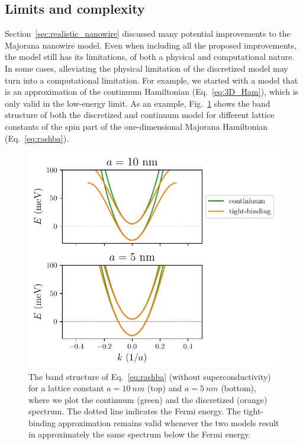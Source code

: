 \subsection{Limits and complexity}
Section~\ref{sec:realistic_nanowire} discussed many potential improvements to the Majorana nanowire model.
Even when including all the proposed improvements, the model still has its limitations, of both a physical and computational nature.
In some cases, alleviating the physical limitation of the discretized model may turn into a computational limitation.
For example, we started with a model that is an approximation of the continuum Hamiltonian (Eq.~\eqref{eq:3D_Ham}), which is only valid in the low-energy limit.
As an example, Fig.~\ref{fig:discretization-approximation} shows the band structure of both the discretized and continuum model for different lattice constants of the spin part of the one-dimensional Majorana Hamiltonian (Eq.~\eqref{eq:rashba}).
\begin{figure}[!htb]
\begin{center}
\includegraphics{chapter_introduction/figures/discretization-approximation.pdf}
\caption{
The band structure of Eq.~\eqref{eq:rashba} (without superconductivity) for a lattice constant $a=\SI{10}{nm}$ (top) and $a=\SI{5}{nm}$ (bottom), where we plot the continuum (green) and the discretized (orange) spectrum.
The dotted line indicates the Fermi energy.
The tight-binding approximation remains valid whenever the two models result in approximately the same spectrum below the Fermi energy.
\label{fig:discretization-approximation}}
\end{center}
\end{figure}
